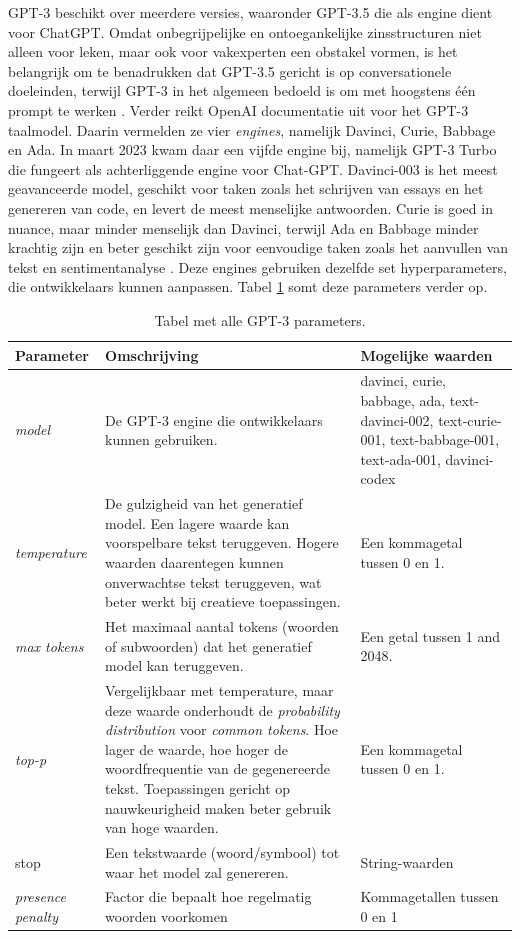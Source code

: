 GPT-3 beschikt over meerdere versies, waaronder GPT-3.5 die als engine dient voor ChatGPT. Omdat onbegrijpelijke en ontoegankelijke zinsstructuren niet alleen voor leken, maar ook voor vakexperten een obstakel vormen, is het belangrijk om te benadrukken dat GPT-3.5 gericht is op conversationele doeleinden, terwijl GPT-3 in het algemeen bedoeld is om met hoogstens één prompt te werken \autocite{McNutt2014, Hubbard2017}. Verder reikt OpenAI documentatie uit voor het GPT-3 taalmodel. Daarin vermelden ze vier \textit{engines}, namelijk Davinci, Curie, Babbage en Ada. In maart 2023 kwam daar een vijfde engine bij, namelijk GPT-3 Turbo die fungeert als achterliggende engine voor Chat-GPT. Davinci-003 is het meest geavanceerde model, geschikt voor taken zoals het schrijven van essays en het genereren van code, en levert de meest menselijke antwoorden. Curie is goed in nuance, maar minder menselijk dan Davinci, terwijl Ada en Babbage minder krachtig zijn en beter geschikt zijn voor eenvoudige taken zoals het aanvullen van tekst en sentimentanalyse \autocite{Brockman2023}. Deze engines gebruiken dezelfde set hyperparameters, die ontwikkelaars kunnen aanpassen. Tabel \ref{table:gpt-3-parameters} somt deze parameters verder op.

\begin{center}
	\begin{table}[H]
	\begin{tabular}{ m{3cm} | m{7cm} | m{4cm} }
		\hline
		\textbf{Parameter} & \textbf{Omschrijving} & \textbf{Mogelijke waarden} \\ \hline
		\textit{model} & De GPT-3 engine die ontwikkelaars kunnen gebruiken. & davinci, curie, babbage, ada, text-davinci-002, text-curie-001, text-babbage-001, text-ada-001, davinci-codex \\ \hline
		\textit{temperature} & De gulzigheid van het generatief model. Een lagere waarde kan voorspelbare tekst teruggeven. Hogere waarden daarentegen kunnen onverwachtse tekst teruggeven, wat beter werkt bij creatieve toepassingen. & Een kommagetal tussen 0 en 1. \\ \hline
		\textit{max tokens} & Het maximaal aantal tokens (woorden of subwoorden) dat het generatief model kan teruggeven. & Een getal tussen 1 and 2048. \\ \hline
		\textit{top-p} & Vergelijkbaar met temperature, maar deze waarde onderhoudt de \textit{probability distribution} voor \textit{common tokens}. Hoe lager de waarde, hoe hoger de woordfrequentie van de gegenereerde tekst. Toepassingen gericht op nauwkeurigheid maken beter gebruik van hoge waarden. & Een kommagetal tussen 0 en 1. \\
		\hline
		stop & Een tekstwaarde (woord/symbool) tot waar het model zal genereren. & String-waarden \\
		\hline
		\textit{presence penalty} & Factor die bepaalt hoe regelmatig woorden voorkomen & Kommagetallen tussen 0 en 1 \\
		\hline
	\end{tabular}
		\caption{Tabel met alle GPT-3 parameters.}
		\label{table:gpt-3-parameters}
	\end{table}
\end{center}

